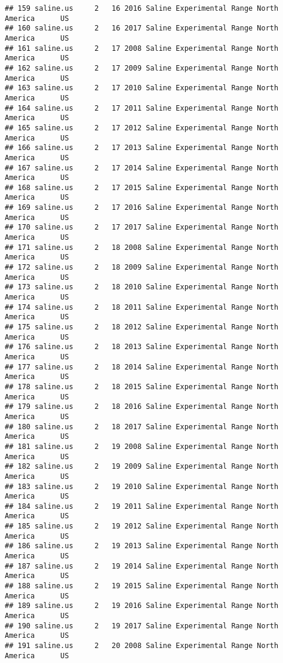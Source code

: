 \documentclass[]{article}
\begin{document}
\begin{verbatim}
## 159 saline.us     2   16 2016 Saline Experimental Range North America      US
## 160 saline.us     2   16 2017 Saline Experimental Range North America      US
## 161 saline.us     2   17 2008 Saline Experimental Range North America      US
## 162 saline.us     2   17 2009 Saline Experimental Range North America      US
## 163 saline.us     2   17 2010 Saline Experimental Range North America      US
## 164 saline.us     2   17 2011 Saline Experimental Range North America      US
## 165 saline.us     2   17 2012 Saline Experimental Range North America      US
## 166 saline.us     2   17 2013 Saline Experimental Range North America      US
## 167 saline.us     2   17 2014 Saline Experimental Range North America      US
## 168 saline.us     2   17 2015 Saline Experimental Range North America      US
## 169 saline.us     2   17 2016 Saline Experimental Range North America      US
## 170 saline.us     2   17 2017 Saline Experimental Range North America      US
## 171 saline.us     2   18 2008 Saline Experimental Range North America      US
## 172 saline.us     2   18 2009 Saline Experimental Range North America      US
## 173 saline.us     2   18 2010 Saline Experimental Range North America      US
## 174 saline.us     2   18 2011 Saline Experimental Range North America      US
## 175 saline.us     2   18 2012 Saline Experimental Range North America      US
## 176 saline.us     2   18 2013 Saline Experimental Range North America      US
## 177 saline.us     2   18 2014 Saline Experimental Range North America      US
## 178 saline.us     2   18 2015 Saline Experimental Range North America      US
## 179 saline.us     2   18 2016 Saline Experimental Range North America      US
## 180 saline.us     2   18 2017 Saline Experimental Range North America      US
## 181 saline.us     2   19 2008 Saline Experimental Range North America      US
## 182 saline.us     2   19 2009 Saline Experimental Range North America      US
## 183 saline.us     2   19 2010 Saline Experimental Range North America      US
## 184 saline.us     2   19 2011 Saline Experimental Range North America      US
## 185 saline.us     2   19 2012 Saline Experimental Range North America      US
## 186 saline.us     2   19 2013 Saline Experimental Range North America      US
## 187 saline.us     2   19 2014 Saline Experimental Range North America      US
## 188 saline.us     2   19 2015 Saline Experimental Range North America      US
## 189 saline.us     2   19 2016 Saline Experimental Range North America      US
## 190 saline.us     2   19 2017 Saline Experimental Range North America      US
## 191 saline.us     2   20 2008 Saline Experimental Range North America      US

\end{verbatim}
\end{document}
